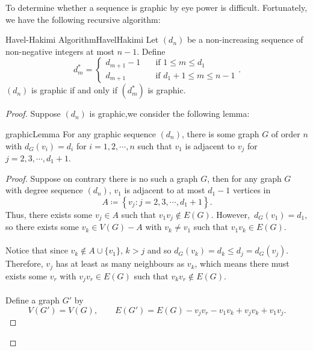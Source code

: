 \documentclass[math, code]{amznotes}
\theoremstyle{remark}
\begin{document}
To determine whether a sequence is graphic by eye power is difficult. Fortunately, we have the following recursive algorithm:
\begin{thmbox}{Havel-Hakimi Algorithm}{HavelHakimi}
    Let $(d_n)$ be a non-increasing sequence of non-negative integers at most $n - 1$. Define
    \begin{equation*}
        d^*_m = \begin{cases}
            d_{m + 1} - 1 & \quad\textrm{if } 1 \leq m \leq d_1 \\
            d_{m + 1} & \quad\textrm{if } d_1 + 1 \leq m \leq n - 1
        \end{cases}.
    \end{equation*}
    $(d_n)$ is graphic if and only if $\left(d^*_m\right)$ is graphic.
    \tcblower
    \begin{proof}
        Suppose $(d_n)$ is graphic,we consider the following lemma:
        \begin{lembox}{}{graphicLemma}
            For any graphic sequence $(d_n)$, there is some graph $G$ of order $n$ with $d_G(v_i) = d_i$ for $i = 1, 2, \cdots, n$ such that $v_1$ is adjacent to $v_j$ for $j = 2, 3, \cdots, d_1 + 1$.
            \tcblower
            \begin{proof}
                Suppose on contrary there is no such a graph $G$, then for any graph $G$ with degree sequence $(d_n)$, $v_1$ is adjacent to at most $d_1 - 1$ vertices in
                \begin{equation*}
                    A \coloneqq \left\{v_j \colon j = 2, 3, \cdots, d_1 + 1\right\}.
                \end{equation*}
                Thus, there exists some $v_j \in A$ such that $v_1v_j \notin E(G)$. However,~$d_G(v_1) = d_1$, so there exists some $v_k \in V(G) - A$ with $v_k \neq v_1$ such that $v_1v_k \in E(G)$.
                \\\\
                Notice that since $v_k \notin A \cup \{v_1\}$, $k > j$ and so $d_G(v_k) = d_k \leq d_j = d_G(v_j)$. Therefore, $v_j$ has at least as many neighbours as $v_k$, which means there must exists some $v_r$ with $v_jv_r \in E(G)$ such that $v_kv_r \notin E(G)$.
                \\\\
                Define a graph $G'$ by
                \begin{equation*}
                    V(G') = V(G), \qquad E(G') = E(G) - v_jv_r - v_1v_k + v_jv_k + v_1v_j.
                \end{equation*}

\end{proof}
\end{lembox}
\end{proof}
\end{thmbox}
\end{document}
